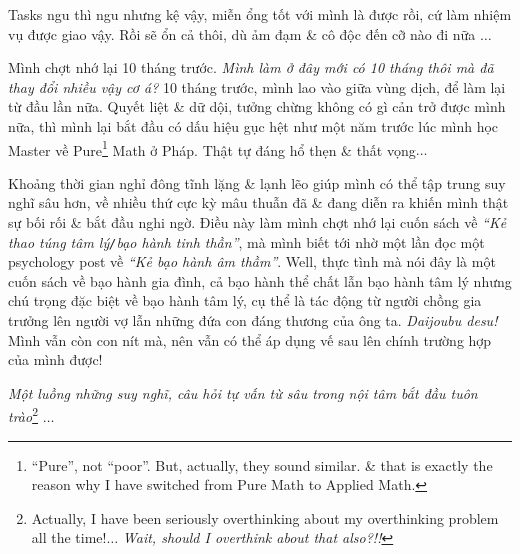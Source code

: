 \documentclass[12pt,oneside]{book}
\begin{document}
Tasks ngu thì ngu nhưng kệ vậy, miễn ổng tốt với mình là được rồi, cứ làm nhiệm vụ được giao vậy. Rồi sẽ ổn cả thôi, dù ảm đạm \& cô độc đến cỡ nào đi nữa $\ldots$

Mình chợt nhớ lại 10 tháng trước. {\it Mình làm ở đây mới có 10 tháng thôi mà đã thay đổi nhiều vậy cơ á?} 10 tháng trước, mình lao vào giữa vùng dịch, để làm lại từ đầu lần nữa. Quyết liệt \& dữ dội, tưởng chừng không có gì cản trở được mình nữa, thì mình lại bắt đầu có dấu hiệu gục hệt như một năm trước lúc mình học Master về Pure\footnote{``Pure'', not ``poor''. But, actually, they sound similar. \& that is exactly the reason why I have switched from Pure Math to Applied Math.} Math ở Pháp. Thật tự đáng hổ thẹn \& thất vọng$\ldots$

Khoảng thời gian nghỉ đông tĩnh lặng \& lạnh lẽo giúp mình có thể tập trung suy nghĩ sâu hơn, về nhiều thứ cực kỳ mâu thuẫn đã \& đang diễn ra khiến mình thật sự bối rối \& bắt đầu nghi ngờ. Điều này làm mình chợt nhớ lại cuốn sách \cite{Bancroft_why_he_do,Bancroft_why_he_do_VN} về {\it``Kẻ thao túng tâm lý{\tt/}bạo hành tinh thần''}, mà mình biết tới nhờ một lần đọc một psychology post về {\it``Kẻ bạo hành âm thầm''}. Well, thực tình mà nói đây là một cuốn sách về bạo hành gia đình, cả bạo hành thể chất lẫn bạo hành tâm lý nhưng chú trọng đặc biệt về bạo hành tâm lý, cụ thể là tác động từ người chồng gia trưởng lên người vợ lẫn những đứa con đáng thương của ông ta. {\it Daijoubu desu!} Mình vẫn còn con nít mà, nên vẫn có thể áp dụng vế sau lên chính trường hợp của mình được!

{\it Một luồng những suy nghĩ, câu hỏi tự vấn từ sâu trong nội tâm bắt đầu tuôn trào}\footnote{Actually, I have been seriously overthinking about my overthinking problem all the time!$\ldots$ {\it Wait, should I overthink about that also?!!}} $\ldots$
\end{document}
